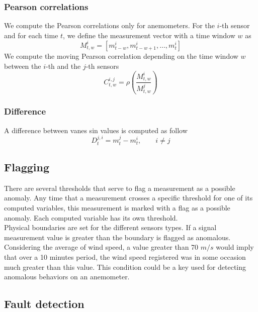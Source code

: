 \documentclass[journal]{IEEEtran}
\begin{document}
\subsubsection{Pearson correlations}
We compute the Pearson correlations only for anemometers. For the $i$-th sensor and for each time $t$, we define the measurement vector with a time window $w$ as 
\begin{equation}
M^i_{t,w} = [m_{t-w}^i,m_{t-w+1}^i,\ldots,m_t^i]
\end{equation}
We compute the moving Pearson correlation depending on the time window $w$ between the $i$-th and the $j$-th sensors
\begin{equation}
C^{i,j}_{t,w}= \rho\left( \frac{M^i_{t,w}}{M^j_{t,w}}\right)
\end{equation}

\subsubsection{Difference}
A difference between vanes sin values is computed as follow
\begin{equation}
D_{t}^{j,i} = {m_{t}^{j} - m_{t}^{i}},\qquad i \neq j 
\end{equation} 


\subsection{Flagging}\label{subsec:flagging}
There are several thresholds that serve to flag a measurement as a possible anomaly. Any time that a measurement crosses a specific threshold for one of its computed variables, this measurement is marked with a flag as a possible anomaly. 
Each computed variable has its own threshold. \\
Physical boundaries are set for the different sensors types. If a signal measurement value is greater than the boundary is flagged as anomalous. Considering the average of wind speed, a value greater than 70 $m/s$ would imply that over a 10 minutes period, the wind speed registered was in some occasion much greater than this value. This condition could be a key used for detecting anomalous behaviors on an anemometer.

\subsection{Fault detection}\label{subsec:faultdetection}
\end{document}
